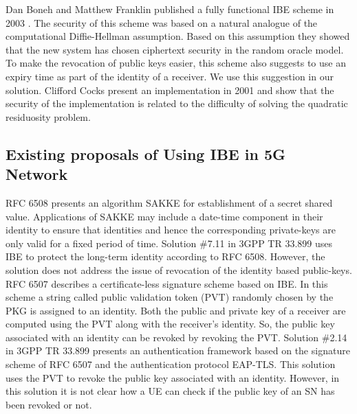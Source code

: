 \documentclass{river-journal}
\begin{document}
Dan Boneh and Matthew Franklin published a fully functional IBE scheme in 2003 \cite{IBE_boneh_franklin}. The security of this scheme was based on a natural analogue of the computational Diffie-Hellman assumption. Based on this assumption they showed that the new system has chosen ciphertext security in the random oracle model. To make the revocation of public keys easier, this scheme also suggests to use an expiry time as part of the identity of a receiver. We use this suggestion in our solution. Clifford Cocks present an implementation in 2001 \cite{IBE_clifford} and show that the security of the implementation is related to the difficulty of solving the quadratic residuosity problem.


\subsection{Existing proposals of Using IBE in 5G Network}
RFC 6508 \cite{RFC6508} presents an algorithm SAKKE for establishment of a secret shared value. Applications of SAKKE may include a date-time component in their identity to ensure that identities and hence the corresponding private-keys are only valid for a fixed period of time. Solution \#7.11 in 3GPP TR 33.899 \cite{TR33899} uses IBE to protect the long-term identity according to RFC 6508. However, the solution does not address the issue of revocation of the identity based public-keys. RFC 6507 \cite{RFC6507} describes a certificate-less signature scheme based on IBE. In this scheme a string called public validation token (PVT) randomly chosen by the PKG is assigned to an identity. Both the public and private key of a receiver are computed using the PVT along with the receiver's identity. So, the public key associated with an identity can be revoked by revoking the PVT. Solution \#2.14 in 3GPP TR 33.899 presents an authentication framework based on the signature scheme of RFC 6507 and the authentication protocol EAP-TLS. This solution uses the PVT to revoke the public key associated with an identity. However, in this solution it is not clear how a UE can check if the public key of an SN has been revoked or not.
\end{document}
